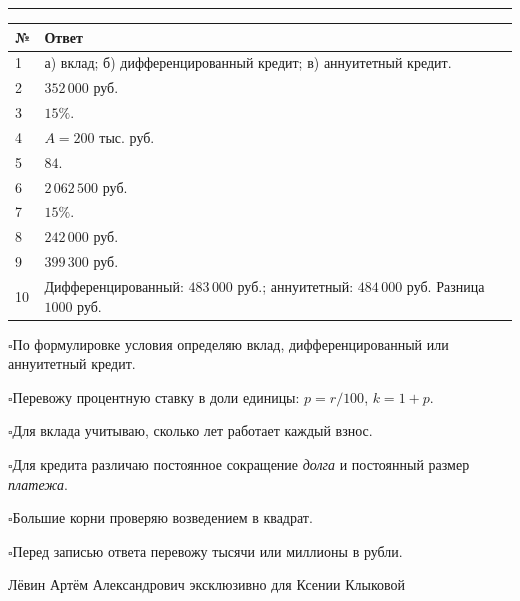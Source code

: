 \documentclass[a4paper,12pt]{article}
\newcommand{\microhead}[1]{\vspace{2mm}{\large\textcolor{darkaccent}{\bfseries #1}}\par\vspace{1mm}}
\newcommand{\topic}[1]{\vspace{4mm}{\Large\textcolor{darkaccent}{\bfseries #1}}\par\vspace{1mm}\textcolor{rulegray}{\rule{\linewidth}{0.35pt}}\vspace{2mm}}
\newcommand{\checkitem}[1]{$\square$\hspace{2mm}#1\par\vspace{1mm}}
\begin{document}
\topic{8. Ответы}
\vspace{2mm}
\renewcommand{\arraystretch}{1.55}
\begin{center}
\begin{tabularx}{\linewidth}{@{}p{16mm}X@{}}
\toprule
\textbf{№} & \textbf{Ответ}\\
\midrule
1 & а) вклад; б) дифференцированный кредит; в) аннуитетный кредит.\\
2 & $352\,000$ руб.\\
3 & $15\%$.\\
4 & $A=200$ тыс. руб.\\
5 & $84$.\\
6 & $2\,062\,500$ руб.\\
7 & $15\%$.\\
8 & $242\,000$ руб.\\
9 & $399\,300$ руб.\\
10 & Дифференцированный: $483\,000$ руб.; аннуитетный: $484\,000$ руб. Разница $1000$ руб.\\
\bottomrule
\end{tabularx}
\end{center}
\vspace{8mm}
\microhead{Итоговая памятка}
\checkitem{По формулировке условия определяю вклад, дифференцированный или аннуитетный кредит.}
\checkitem{Перевожу процентную ставку в доли единицы: $p=r/100$, $k=1+p$.}
\checkitem{Для вклада учитываю, сколько лет работает каждый взнос.}
\checkitem{Для кредита различаю постоянное сокращение \emph{долга} и постоянный размер \emph{платежа}.}
\checkitem{Большие корни проверяю возведением в квадрат.}
\checkitem{Перед записью ответа перевожу тысячи или миллионы в рубли.}
\vfill
\begin{center}
\textcolor{mutedgray}{\footnotesize Лёвин Артём Александрович эксклюзивно для Ксении Клыковой}
\end{center}
\end{document}
